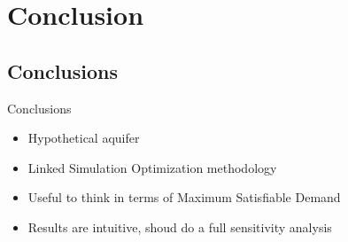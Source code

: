 \documentclass[xcolor=x11names,compress]{beamer}
\renewcommand{\(}{\begin{columns}}
\renewcommand{\)}{\end{columns}}
\newcommand{\<}[1]{\begin{column}{#1}}
\renewcommand{\>}{\end{column}}
\begin{document}
\section{Conclusion}
\subsection{Conclusions}
\begin{frame}{Conclusions}

\begin{itemize}
	\item Hypothetical aquifer
	\pause
	\item Linked Simulation Optimization methodology
	\pause
	\item Useful to think in terms of Maximum Satisfiable Demand
	\pause
	\item Results are intuitive, shoud do a full sensitivity analysis
\end{itemize} 

\end{frame}
\end{document}
